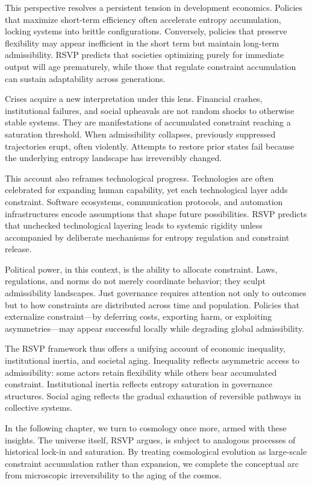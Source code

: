 \documentclass[11pt,oneside]{book}
\begin{document}
This perspective resolves a persistent tension in development economics. Policies that maximize short-term efficiency often accelerate entropy accumulation, locking systems into brittle configurations. Conversely, policies that preserve flexibility may appear inefficient in the short term but maintain long-term admissibility. RSVP predicts that societies optimizing purely for immediate output will age prematurely, while those that regulate constraint accumulation can sustain adaptability across generations.

Crises acquire a new interpretation under this lens. Financial crashes, institutional failures, and social upheavals are not random shocks to otherwise stable systems. They are manifestations of accumulated constraint reaching a saturation threshold. When admissibility collapses, previously suppressed trajectories erupt, often violently. Attempts to restore prior states fail because the underlying entropy landscape has irreversibly changed.

This account also reframes technological progress. Technologies are often celebrated for expanding human capability, yet each technological layer adds constraint. Software ecosystems, communication protocols, and automation infrastructures encode assumptions that shape future possibilities. RSVP predicts that unchecked technological layering leads to systemic rigidity unless accompanied by deliberate mechanisms for entropy regulation and constraint release.

Political power, in this context, is the ability to allocate constraint. Laws, regulations, and norms do not merely coordinate behavior; they sculpt admissibility landscapes. Just governance requires attention not only to outcomes but to how constraints are distributed across time and population. Policies that externalize constraint—by deferring costs, exporting harm, or exploiting asymmetries—may appear successful locally while degrading global admissibility.

The RSVP framework thus offers a unifying account of economic inequality, institutional inertia, and societal aging. Inequality reflects asymmetric access to admissibility: some actors retain flexibility while others bear accumulated constraint. Institutional inertia reflects entropy saturation in governance structures. Social aging reflects the gradual exhaustion of reversible pathways in collective systems.

In the following chapter, we turn to cosmology once more, armed with these insights. The universe itself, RSVP argues, is subject to analogous processes of historical lock-in and saturation. By treating cosmological evolution as large-scale constraint accumulation rather than expansion, we complete the conceptual arc from microscopic irreversibility to the aging of the cosmos.
\end{document}
